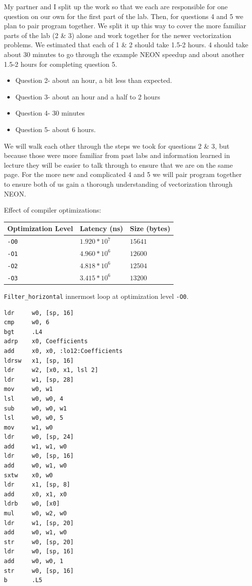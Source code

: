\documentclass[
  course = {{ESE532 System-on-a-Chip}},
  quartile = {{}},
  assignment = 4,
  name = {{Sheil Sarda, Kate Ballard}},
  studentnumber = {{}},
  email = {{sheils@seas.upenn.edu, kballard@seas.upenn.edu}},
  firstexercise = 1
]{aga-homework}
\begin{document}
\exercise
\subexercise My partner and I split up the work so that we each are responsible for one question on our own for the first part of the lab.  Then, for questions 4 and 5 we plan to pair program together.  We split it up this way to cover the more familiar parts of the lab (2 \& 3) alone and work together for the newer vectorization problems.
\subexercise
We estimated that each of 1 \& 2 should take 1.5-2 hours.  4 should take about 30 minutes to go through the example NEON speedup and about another 1.5-2 hours for completing question 5.
\subexercise
\begin{itemize}
	\item Question 2- about an hour, a bit less than expected.
	\item Question 3- about an hour and a half to 2 hours
	\item Question 4- 30 minutes
	\item Question 5- about 6 hours.
\end{itemize}
\subexercise
We will walk each other through the steps we took for questions 2 \& 3, but because those were more familiar from past labs and information learned in lecture they will be easier to talk through to ensure that we are on the same page.  For the more new and complicated 4 and 5 we will pair program together to ensure both of us gain a thorough understanding of vectorization through NEON.

\exercise
\subexercise Effect of compiler optimizations:
\begin{table}[h]
	\centering
	\begin{tabular}{|l|l|l|}
		\hline
		Optimization Level &  Latency (ns) & Size (bytes)\\ \hline
		\verb|-O0| & $1.920*10^7$ & $15641$\\ \hline
		\verb|-O1| & $4.960*10^6$ & $12600$\\ \hline
		\verb|-O2| & $4.818*10^6$ & $12504$\\ \hline
		\verb|-O3| & $3.415*10^6$ & $13200$\\ \hline			
	\end{tabular}
\end{table}

\subexercise \verb|Filter_horizontal| innermost loop at optimization level \verb|-O0|.
\begin{verbatim}
ldr     w0, [sp, 16]
cmp     w0, 6
bgt     .L4
adrp    x0, Coefficients
add     x0, x0, :lo12:Coefficients
ldrsw   x1, [sp, 16]
ldr     w2, [x0, x1, lsl 2]
ldr     w1, [sp, 28]
mov     w0, w1
lsl     w0, w0, 4
sub     w0, w0, w1
lsl     w0, w0, 5
mov     w1, w0
ldr     w0, [sp, 24]
add     w1, w1, w0
ldr     w0, [sp, 16]
add     w0, w1, w0
sxtw    x0, w0
ldr     x1, [sp, 8]
add     x0, x1, x0
ldrb    w0, [x0]
mul     w0, w2, w0
ldr     w1, [sp, 20]
add     w0, w1, w0
str     w0, [sp, 20]
ldr     w0, [sp, 16]
add     w0, w0, 1
str     w0, [sp, 16]
b       .L5
\end{verbatim}
\end{document}
